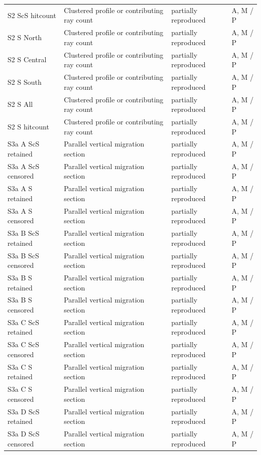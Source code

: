 \documentclass[10pt]{article}
\begin{document}
\begin{longtable}{p{.23\linewidth}p{.25\linewidth}p{.19\linewidth}p{.22\linewidth}}
S2 ScS hitcount & Clustered profile or contributing ray count & partially reproduced & A, M / P \\
S2 S North & Clustered profile or contributing ray count & partially reproduced & A, M / P \\
S2 S Central & Clustered profile or contributing ray count & partially reproduced & A, M / P \\
S2 S South & Clustered profile or contributing ray count & partially reproduced & A, M / P \\
S2 S All & Clustered profile or contributing ray count & partially reproduced & A, M / P \\
S2 S hitcount & Clustered profile or contributing ray count & partially reproduced & A, M / P \\
S3a A ScS retained & Parallel vertical migration section & partially reproduced & A, M / P \\
S3a A ScS censored & Parallel vertical migration section & partially reproduced & A, M / P \\
S3a A S retained & Parallel vertical migration section & partially reproduced & A, M / P \\
S3a A S censored & Parallel vertical migration section & partially reproduced & A, M / P \\
S3a B ScS retained & Parallel vertical migration section & partially reproduced & A, M / P \\
S3a B ScS censored & Parallel vertical migration section & partially reproduced & A, M / P \\
S3a B S retained & Parallel vertical migration section & partially reproduced & A, M / P \\
S3a B S censored & Parallel vertical migration section & partially reproduced & A, M / P \\
S3a C ScS retained & Parallel vertical migration section & partially reproduced & A, M / P \\
S3a C ScS censored & Parallel vertical migration section & partially reproduced & A, M / P \\
S3a C S retained & Parallel vertical migration section & partially reproduced & A, M / P \\
S3a C S censored & Parallel vertical migration section & partially reproduced & A, M / P \\
S3a D ScS retained & Parallel vertical migration section & partially reproduced & A, M / P \\
S3a D ScS censored & Parallel vertical migration section & partially reproduced & A, M / P \\

\end{longtable}
\end{document}
